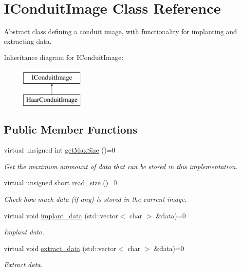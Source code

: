 \hypertarget{classefb_1_1IConduitImage}{
\section{IConduitImage Class Reference}
\label{classefb_1_1IConduitImage}
}


Abstract class defining a conduit image, with functionality for implanting and extracting data.  


Inheritance diagram for IConduitImage:\begin{figure}[H]
\begin{center}
\leavevmode
\includegraphics[height=2.000000cm]{classefb_1_1IConduitImage}
\end{center}
\end{figure}
\subsection*{Public Member Functions}
\begin{DoxyCompactItemize}
\item 
virtual unsigned int \hyperlink{classefb_1_1IConduitImage_ab697b8ff0b8bc87a3f17a8af30fa37e2}{getMaxSize} ()=0
\begin{DoxyCompactList}\small\item\em Get the maximum ammount of data that can be stored in this implementation. \item\end{DoxyCompactList}\item 
virtual unsigned short \hyperlink{classefb_1_1IConduitImage_a7070b468d77b99cb6e26849b938264b9}{read\_\-size} ()=0
\begin{DoxyCompactList}\small\item\em Check how much data (if any) is stored in the current image. \item\end{DoxyCompactList}\item 
virtual void \hyperlink{classefb_1_1IConduitImage_a20a2b214e8535fa70790a9b9012693ae}{implant\_\-data} (std::vector$<$ char $>$ \&data)=0
\begin{DoxyCompactList}\small\item\em Implant data. \item\end{DoxyCompactList}\item 
virtual void \hyperlink{classefb_1_1IConduitImage_a4023566af236193894767c84f1a27d02}{extract\_\-data} (std::vector$<$ char $>$ \&data)=0
\begin{DoxyCompactList}\small\item\em Extract data. \item\end{DoxyCompactList}\end{DoxyCompactItemize}


